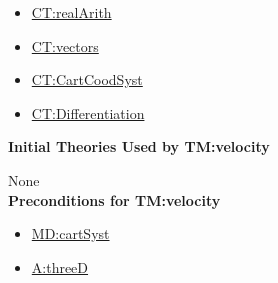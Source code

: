 \documentclass[12pt]{article}
\begin{document}
\begin{itemize}
\item \hyperref[CT:realArith]{CT:realArith}
\item \hyperref[CT:vectors]{CT:vectors}
\item \hyperref[CT:CartCoordSyst]{CT:CartCoodSyst}
\item \hyperref[CT:Differentiation]{CT:Differentiation}
\end{itemize}

\noindent \textbf{Initial Theories Used by TM:velocity}

None
~\\

\noindent \textbf{Preconditions for TM:velocity}

\begin{itemize}
\item \hyperref[MD:cartSyst]{MD:cartSyst}
\item \hyperref[threeD]{A:threeD}
\end{itemize}
\end{document}

